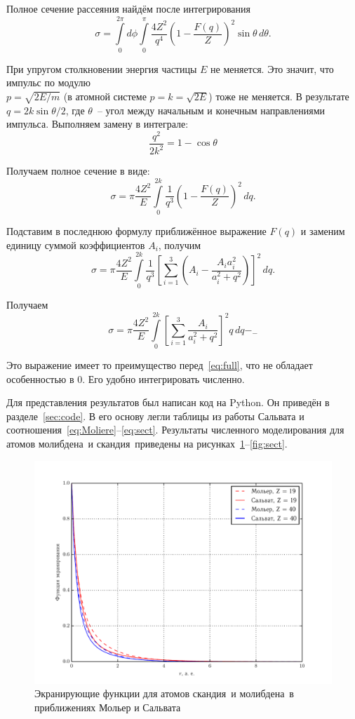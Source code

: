 \documentclass[10pt,pscyr]{hedlab}
\newcommand{\fiat}{скандия~}
\newcommand{\seat}{молибдена~}
\newcommand{\eq}  [1]{\eqref{eq:#1}}
\newcommand{\fig} [1]{\ref{fig:#1}}
\newcommand{\sect}[1]{\ref{sec:#1}}
\begin{document}
  Полное сечение рассеяния найдём после интегрирования 
  \begin{equation}
    \sigma = \int\limits_0^{2\pi} d\phi \int\limits_0^\pi \frac{4Z^2}{q^4}
      \left( 1 - \frac{F(q)}{Z} \right)^2 \sin\theta\,d\theta.
  \end{equation}
 
  При упругом столкновении энергия частицы \( E \) не меняется. Это
  значит, что импульс по модулю \\ \( p = \sqrt{2E/m} \) (в атомной системе
  \( p = k = \sqrt{2E} \)) тоже не меняется. В результате
  \( q = 2 k \sin \theta / 2\), где \( \theta \)~-- угол между начальным и
  конечным направлениями импульса. Выполняем замену в интеграле:
  \[
    \frac{q^2}{2k^2} = 1-\cos \theta
  \]

  Получаем полное сечение в виде:
  \begin{equation}
    \sigma = \pi \frac{4Z^2}{E} \int\limits_0^{2k} \frac{1}{q^3}
      \left( 1 - \frac{F(q)}{Z} \right)^2\,dq.
    \label{eq:full}
  \end{equation}

  Подставим в последнюю формулу приближённое выражение \( F(q) \)
  и заменим единицу суммой коэффициентов \( A_i \), получим
  \[
    \sigma = \pi \frac{4Z^2}{E} \int\limits_0^{2k} \frac{1}{q^3}
      \left[ \sum_{i = 1}^3 \left( A_i - \frac{A_ia_i^2}{a_i^2 + q^2} \right)
      \right]^2\,dq.
  \]

  Получаем
  \begin{equation}
    \sigma = \pi \frac{4Z^2}{E} \int\limits_0^{2k}
      \left[ \sum_{i = 1}^3 \frac{A_i}{a_i^2 + q^2}  \right]^2 q\,dq
    \label{eq:sect} -_-
  \end{equation}

  Это выражение имеет то преимущество перед~\eq{full}, что
  не обладает особенностью в 0. Его удобно интегрировать
  численно.
  
  Для представления результатов был написан код на Python.
  Он приведён в разделе~\sect{code}. В его основу легли
  таблицы из работы Сальвата и
  соотношения~\eq{Moliere}--\eq{sect}. Результаты численного
  моделирования для атомов \seat и \fiat приведены на
  рисунках~\fig{screening}--\fig{sect}.

  \begin{figure}[h!]
    \centering
    \includegraphics[width=.7\textwidth]{screening}
    \caption{Экранирующие функции для атомов \fiat и
      \seat в приближениях Мольер и Сальвата}
    \label{fig:screening}
    \end{figure}
  
\end{document}
